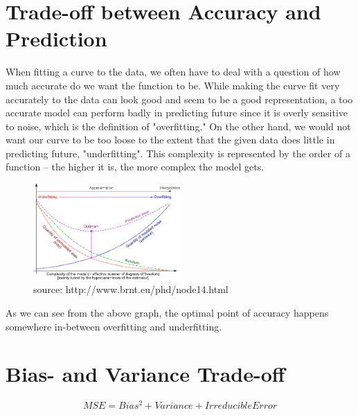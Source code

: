 \section{Trade-off between Accuracy and Prediction}

When fitting a curve to the data, we often have to deal with a question of how much accurate do we want the function to be. While making the curve fit very accurately to the data can look good and seem to be a good representation, a too accurate model can perform badly in predicting future since it is overly sensitive to noise, which is the definition of "overfitting." On the other hand, we would not want our curve to be too loose to the extent that the given data does little in predicting future, "underfitting". This complexity is represented by the order of a function -- the higher it is, the more complex the model gets. 

\begin{figure}[ht]
  \begin{center}
    \includegraphics[width=0.5\textwidth]{figures/figure1.png}
    \caption{
      source: http://www.brnt.eu/phd/node14.html}
    \label{fig:example_figure}
  \end{center}
\end{figure}
As we can see from the above graph, the optimal point of accuracy happens somewhere in-between overfitting and underfitting.\newline 

\section{Bias- and Variance Trade-off}
\[MSE = Bias^2 + Variance + Irreducible Error\]

